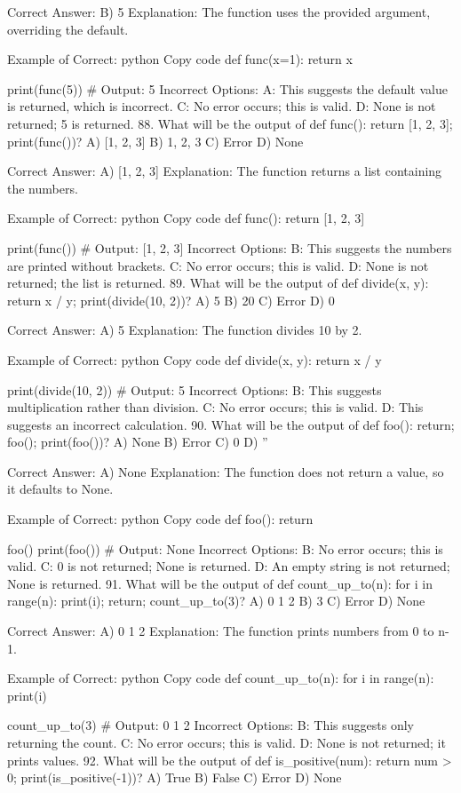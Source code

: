 Correct Answer: B) 5
Explanation: The function uses the provided argument, overriding the default.

Example of Correct:
python
Copy code
def func(x=1):
    return x

print(func(5))  # Output: 5
Incorrect Options:
A: This suggests the default value is returned, which is incorrect.
C: No error occurs; this is valid.
D: None is not returned; 5 is returned.
88. What will be the output of def func(): return [1, 2, 3]; print(func())?
A) [1, 2, 3]
B) 1, 2, 3
C) Error
D) None

Correct Answer: A) [1, 2, 3]
Explanation: The function returns a list containing the numbers.

Example of Correct:
python
Copy code
def func():
    return [1, 2, 3]

print(func())  # Output: [1, 2, 3]
Incorrect Options:
B: This suggests the numbers are printed without brackets.
C: No error occurs; this is valid.
D: None is not returned; the list is returned.
89. What will be the output of def divide(x, y): return x / y; print(divide(10, 2))?
A) 5
B) 20
C) Error
D) 0

Correct Answer: A) 5
Explanation: The function divides 10 by 2.

Example of Correct:
python
Copy code
def divide(x, y):
    return x / y

print(divide(10, 2))  # Output: 5
Incorrect Options:
B: This suggests multiplication rather than division.
C: No error occurs; this is valid.
D: This suggests an incorrect calculation.
90. What will be the output of def foo(): return; foo(); print(foo())?
A) None
B) Error
C) 0
D) ''

Correct Answer: A) None
Explanation: The function does not return a value, so it defaults to None.

Example of Correct:
python
Copy code
def foo():
    return

foo()
print(foo())  # Output: None
Incorrect Options:
B: No error occurs; this is valid.
C: 0 is not returned; None is returned.
D: An empty string is not returned; None is returned.
91. What will be the output of def count_up_to(n): for i in range(n): print(i); return; count_up_to(3)?
A) 0 1 2
B) 3
C) Error
D) None

Correct Answer: A) 0 1 2
Explanation: The function prints numbers from 0 to n-1.

Example of Correct:
python
Copy code
def count_up_to(n):
    for i in range(n):
        print(i)

count_up_to(3)  # Output: 0 1 2
Incorrect Options:
B: This suggests only returning the count.
C: No error occurs; this is valid.
D: None is not returned; it prints values.
92. What will be the output of def is_positive(num): return num > 0; print(is_positive(-1))?
A) True
B) False
C) Error
D) None

